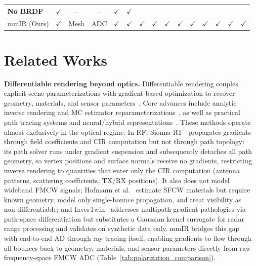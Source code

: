 \begin{table}[t]
{\begin{tabular}{|l|c|c|c|c|c|c|c|c|c|c|c|c|c|c|}
\cellcolor{lightyellow}No BRDF &
\cellcolor{lightgreen}$\checkmark$ &
\cellcolor{lightred}-- &
\cellcolor{lightred}-- &
\cellcolor{lightgreen}$\checkmark$ &
\cellcolor{lightgreen}$\checkmark$ \\
\hline
\cellcolor{lightergray}mmIR (Ours) &
\cellcolor{lightgreen}$\checkmark$ &
\cellcolor{lightgreen}Mesh &
\cellcolor{lightgreen}ADC &
\cellcolor{lightgreen}$\checkmark$ &
\cellcolor{lightgreen}$\checkmark$ &
\cellcolor{lightgreen}$\checkmark$ &
\cellcolor{lightgreen}$\checkmark$ &
\cellcolor{lightgreen}$\checkmark$ &
\cellcolor{lightgreen}$\checkmark$ &
\cellcolor{lightgreen}$\checkmark$ &
\cellcolor{lightgreen}$\checkmark$ &
\cellcolor{lightgreen}$\checkmark$ &
\cellcolor{lightgreen}$\checkmark$ &
\cellcolor{lightgreen}$\checkmark$ \\
\hline
\end{tabular}
}
\end{table}

\section{Related Works}

\textbf{Differentiable rendering beyond optics.}
Differentiable rendering couples explicit scene parameterizations with gradient-based optimization to recover geometry, materials, and sensor parameters~\cite{veach1995optimally, veach1998robust, ramamoorthi2007first, gargallo2007minimizing}. Core advances include analytic inverse rendering and MC estimator reparameterizations~\cite{li2018differentiable,loubet2019reparameterizing, bangaru2020unbiased}, as well as practical path tracing systems and neural/hybrid representations~\cite{mildenhall2021nerf, 10.1145/3550469.3555397, zhang2022iron, 10.1145/3355089.3356498, jakob2022dr, bangaru2023slang}. These methods operate almost exclusively in the optical regime. In RF, Sionna RT~\cite{sionna} propagates gradients through field coefficients and CIR computation but not through path topology: its path solver runs under gradient suspension and subsequently detaches all path geometry, so vertex positions and surface normals receive no gradients, restricting inverse rendering to quantities that enter only the CIR computation (antenna patterns, scattering coefficients, TX/RX positions). It also does not model wideband FMCW signals; Hofmann et al.~\cite{hofmann2025inverse} estimate SFCW materials but require known geometry, model only single-bounce propagation, and treat visibility as non-differentiable; and InverTwin~\cite{chen2025invertwin} addresses multipath gradient pathologies via path-space differentiation but substitutes a Gaussian kernel surrogate for radar range processing and validates on synthetic data only. mmIR bridges this gap with end-to-end AD through ray tracing itself, enabling gradients to flow through all bounces back to geometry, materials, and sensor parameters directly from raw frequency-space FMCW ADC (Table~\ref{tab:polarization_comparison}).

